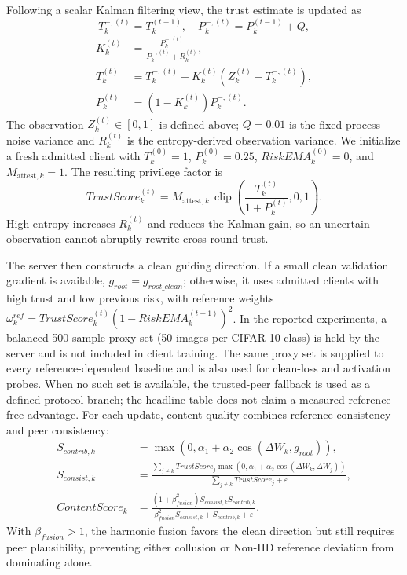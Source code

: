\documentclass[runningheads,orivec]{llncs}
\begin{document}
Following a scalar Kalman filtering view, the trust estimate is updated as
\begin{equation}
    T_{k}^{-,(t)}=T_k^{(t-1)},\quad P_{k}^{-,(t)}=P_k^{(t-1)}+Q,
\end{equation}
\begin{equation}
\begin{aligned}
    K_k^{(t)}&=\frac{P_k^{-,(t)}}{P_k^{-,(t)}+R_k^{(t)}},\\
    T_k^{(t)}&=T_k^{-,(t)}+K_k^{(t)}(Z_k^{(t)}-T_k^{-,(t)}),\\
    P_k^{(t)}&=(1-K_k^{(t)})P_k^{-,(t)}.
\end{aligned}
\end{equation}
The observation $Z_k^{(t)}\in[0,1]$ is defined above; $Q=0.01$ is the fixed process-noise variance and $R_k^{(t)}$ is the entropy-derived observation variance. We initialize a fresh admitted client with $T_k^{(0)}=1$, $P_k^{(0)}=0.25$, $RiskEMA_k^{(0)}=0$, and $M_{\text{attest},k}=1$. The resulting privilege factor is
\begin{equation}
    TrustScore_k^{(t)}=M_{\text{attest},k}\,\operatorname{clip}\!\left(\frac{T_k^{(t)}}{1+P_k^{(t)}},0,1\right).
\end{equation}
High entropy increases $R_k^{(t)}$ and reduces the Kalman gain, so an uncertain observation cannot abruptly rewrite cross-round trust.

    The server then constructs a clean guiding direction. If a small clean validation gradient is available, $g_{root}=g_{root\_clean}$; otherwise, it uses admitted clients with high trust and low previous risk, with reference weights $\omega_k^{ref}=TrustScore_k^{(t)}(1-RiskEMA_k^{(t-1)})^2$. In the reported experiments, a balanced 500-sample proxy set (50 images per CIFAR-10 class) is held by the server and is not included in client training. The same proxy set is supplied to every reference-dependent baseline and is also used for clean-loss and activation probes. When no such set is available, the trusted-peer fallback is used as a defined protocol branch; the headline table does not claim a measured reference-free advantage. For each update, content quality combines reference consistency and peer consistency:
\begin{align}
    S_{contrib,k}  & =\max(0,\alpha_1+\alpha_2\cos(\Delta W_k,g_{root})),                                  \\
    S_{consist,k}  & =\frac{\sum_{j\ne k}TrustScore_j\max(0,\alpha_1+\alpha_2\cos(\Delta W_k,\Delta W_j))}
    {\sum_{j\ne k}TrustScore_j+\varepsilon},                                                               \\
    ContentScore_k & =\frac{(1+\beta_{fusion}^2)S_{consist,k}S_{contrib,k}}
    {\beta_{fusion}^2S_{consist,k}+S_{contrib,k}+\varepsilon}.
\end{align}
With $\beta_{fusion}>1$, the harmonic fusion favors the clean direction but still requires peer plausibility, preventing either collusion or Non-IID reference deviation from dominating alone.
\end{document}
